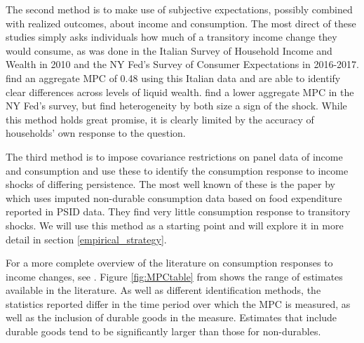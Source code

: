 \documentclass[titlepage]{\econtex}\newcommand{\texname}{IncomeUncertainty}
\begin{document}
The second method is to make use of subjective expectations, possibly combined with realized outcomes, about income and consumption. The most direct of these studies simply asks individuals how much of a transitory income change they would consume, as was done in the Italian Survey of Household Income and Wealth in 2010 and the NY Fed's Survey of Consumer
Expectations in 2016-2017. \cite{jappelli_fiscal_2014} find an aggregate MPC of 0.48 using this Italian data and are able to identify clear differences across levels of liquid wealth. \cite{fuster_what_2018} find a lower aggregate MPC in the NY Fed's survey, but find heterogeneity by both size a sign of the shock. While this method holds great promise, it is clearly limited by the accuracy of households' own response to the question.

The third method is to impose covariance restrictions on panel data of income and consumption and use these to identify the consumption response to income shocks of differing persistence. The most well known of these is the paper by \cite{blundell_consumption_2008} which uses imputed non-durable consumption data based on food expenditure reported in PSID data. They find very little consumption response to transitory shocks. We will use this method as a starting point and will explore it in more detail in section \ref{empirical_strategy}.

For a more complete overview of the literature on consumption responses to income changes, see \cite{jappelli_consumption_2010}. Figure \ref{fig:MPCtable} from \cite{carroll_distribution_2016} shows the range of estimates available in the literature. As well as different identification methods, the statistics reported differ in the time period over which the MPC is measured, as well as the inclusion of durable goods in the measure. Estimates that include durable goods tend to be significantly larger than those for non-durables.
\end{document}
